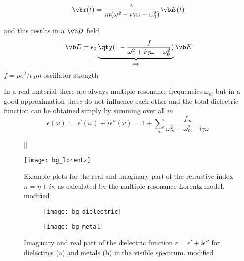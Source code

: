 \begin{equation}
    \vb x(t) = \frac{e}{m(\omega^2 + i \gamma \omega - \omega_0^2)} \vb E(t)
\end{equation}

and this results in a $\vb D$ field
\begin{equation}
    \vb D = 
    \epsilon_0 \underbrace{ 
    \qty(1 - \frac{f}{\omega^2 + i \gamma \omega - \omega_0^2})
    }_{
        =\epsilon
    }
    \vb E
\end{equation}
\indent
$f = \rho e^2 / \epsilon_0 m$ oscillator strength

In a real material there are always multiple resonance frequencies $\omega_m$ but in a good approximation these do not influence each other and the total dielectric function can be obtained simply by summing over all $m$ \cite{FOMO}
\begin{equation}
    \epsilon(\omega) := 
    \epsilon'(\omega) + i \epsilon''(\omega) = 
    1 + \sum_m \frac{f_m}{\omega_m^2 - \omega_0^2 - i \gamma \omega}
\end{equation}

\begin{figure}[H]
    [\FBwidth]
    {\caption{
        Example plots for the real and imaginary part of the refractive index 
        $n = \eta + i\kappa$
        as calculated by the multiple resonance Lorentz model.
        \cite{FOMO} modified
    }
    \label{fig:bg:lorentz}}
    {\texttt{[image: bg\_lorentz]}}
\end{figure}

\begin{figure}[H]
    \centering
    \begin{subfigure}{.5\textwidth}
        \centering
        \texttt{[image: bg\_dielectric]}
        \caption{}
        \label{fig:bg:dielectric}
    \end{subfigure}%
    \begin{subfigure}{.5\textwidth}
        \centering
        \texttt{[image: bg\_metal]}
        \caption{}
        \label{fig:bg:metal}
    \end{subfigure}
    \caption{Imaginary and real part of the dielectric function 
    $\epsilon = \epsilon' + i \epsilon''$
    for dielectrics (a) and metals (b) in the visible spectrum.
    \cite{FOMO} modified}
    \label{fig:bg:dm}
    \end{figure}

